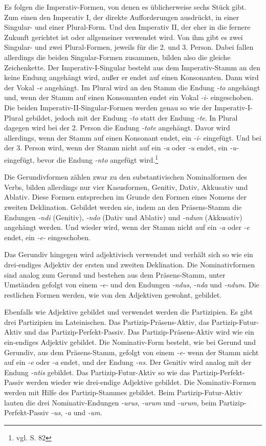 Es folgen die Imperativ-Formen, von denen es üblicherweise sechs Stück gibt. Zum einen den Imperativ I, der direkte Aufforderungen ausdrückt, in einer Singular- und einer Plural-Form. Und den Imperativ II, der eher in die fernere Zukunft gerichtet ist oder allgemeiner verwendet wird. Von ihm gibt es zwei Singular- und zwei Plural-Formen, jeweils für die 2. und 3. Person. Dabei fallen allerdings die beiden Singular-Formen zusammen, bilden also die gleiche Zeichenkette. Der Imperativ-I-Singular besteht aus dem Imperativ-Stamm an den keine Endung angehängt wird, außer er endet auf einen Konsonanten. Dann wird der Vokal \textit{-e} angehängt. Im Plural wird an den Stamm die Endung \textit{-to} angehängt und, wenn der Stamm auf einen Konsonanten endet ein Vokal \textit{-i-} eingeschoben. Die beiden Imperativ-II-Singular-Formen werden genau so wie der Imperativ-I-Plural gebildet, jedoch mit der Endung \textit{-to} statt der Endung \textit{-te}. In Plural dagegen wird bei der 2. Person die Endung \textit{-tote} angehängt. Davor wird allerdings, wenn der Stamm auf einen Konsonant endet, ein \textit{-i-} eingefügt. Und bei der 3. Person wird, wenn der Stamm nicht auf ein \textit{-a} oder \textit{-u} endet, ein \textit{-u-} eingefügt, bevor die Endung \textit{-nto} angefügt wird.\footnote{vgl. \cite{BAYER-LINDAUER1994} S. 82} \par
Die Gerundivformen zählen zwar zu den substantivischen Nominalformen des Verbs, bilden allerdings nur vier Kasusformen, Genitiv, Dativ, Akkusativ und Ablativ. Diese Formen entsprechen im Grunde den Formen eines Nomens der zweiten Deklination. Gebildet werden sie, indem an den Präsens-Stamm die Endungen \textit{-ndi} (Genitiv), \textit{-ndo} (Dativ und Ablativ) und \textit{-ndum} (Akkusativ) angehängt werden. Und wieder wird, wenn der Stamm nicht auf ein \textit{-a} oder \textit{-e} endet, ein \textit{-e-} eingeschoben.\par
Das Gerundiv hingegen wird adjektivisch verwendet und verhält sich so wie ein drei-endiges Adjektiv der ersten und zweiten Deklination. Die Nominativformen sind analog zum Gerund und bestehen aus dem Präsens-Stamm, unter Umständen gefolgt von einem \textit{-e-} und den Endungen \textit{-ndus}, \textit{-nda} und \textit{-ndum}. Die restlichen Formen werden, wie von den Adjektiven gewohnt, gebildet.\par
Ebenfalls wie Adjektive gebildet und verwendet werden die Partizipien. Es gibt drei Partizipien im Lateinischen. Das Partizip-Präsens-Aktiv, das Partizip-Futur-Aktiv und das Partizip-Perfekt-Passiv. Das Partizip-Präsens-Aktiv wird wie ein ein-endiges Adjektiv gebildet. Die Nominativ-Form besteht, wie bei Gerund und Gerundiv, aus dem Präsens-Stamm, gefolgt von einem \textit{-e-} wenn der Stamm nicht auf ein \textit{-e} oder \textit{-a} endet, und der Endung \textit{-ns}. Der Genitiv wird analog mit der Endung \textit{-ntis} gebildet. Das Partizip-Futur-Aktiv so wie das Partizip-Perfekt-Passiv werden wieder wie drei-endige Adjektive gebildet. Die Nominativ-Formen werden mit Hilfe des Partizip-Stammes gebildet. Beim Partizip-Futur-Aktiv lauten die drei Nominativ-Endungen \textit{-urus}, \textit{-urum} und \textit{-urum}, beim Partizip-Perfekt-Passiv \textit{-us}, \textit{-a} und \textit{-um}.
